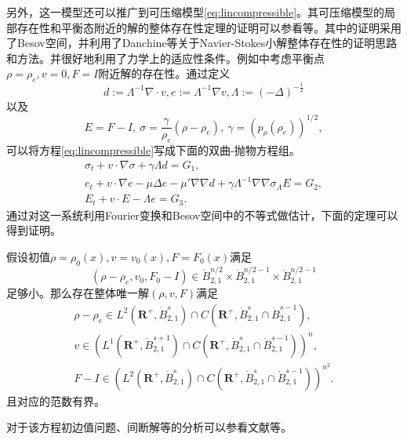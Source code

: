 \documentclass{article}
\begin{document}
另外，这一模型还可以推广到可压缩模型\eqref{eq:lincompressible}。其可压缩模型的局部存在性和平衡态附近的解的整体存在性定理的证明可以参看\cite{qian2010global,hu2011global,hu2012strong}等。其中的证明采用了Besov空间，并利用了Danchine等关于Navier-Stokes小解整体存在性的证明思路和方法\cite{danchin2000global}。并很好地利用了力学上的适应性条件。例如\cite{qian2010global}中考虑平衡点$\rho=\rho_e,v=0,F=I$附近解的存在性。通过定义
\begin{equation*}
	d:=\Lambda^{-1} \nabla \cdot v, e:= \Lambda^{-1} \nabla v, \Lambda :=(-\Delta)^{-\frac{1}{2}}
\end{equation*}
以及
\begin{equation*}
	E=F-I, \ \sigma = \frac{\gamma}{\rho_e} (\rho - \rho_e), \ \gamma = (p_{\rho}(\rho_e))^{1/2},
\end{equation*}
可以将方程\eqref{eq:lincompressible}写成下面的双曲-抛物方程组。
\begin{eqnarray*}
	\sigma_t + v \cdot \nabla \sigma + \gamma \Lambda d = G_1, \\
	e_t + v \cdot \nabla e - \mu \Delta e - \mu' \nabla \nabla d + \gamma \Lambda^{-1} \nabla \nabla \sigma _ \Lambda E = G_2, \\
	E_t + v \cdot E - \Lambda e = G_3.
\end{eqnarray*}
通过对这一系统利用Fourier变换和Besov空间中的不等式做估计，下面的定理可以得到证明\cite{qian2010global,hu2011global}。
\begin{theorem}
	假设初值$\rho=\rho_0(x),v=v_0(x),F=F_0(x)$满足
	\begin{equation*}
		(\rho - \rho_e,v_0,F_0-I) \in \dot{B}_{2,1}^{n/2} \times \dot{B}_{2,1}^{n/2-1} \times \dot{B}_{2,1}^{n/2-1}
	\end{equation*}
	足够小。那么存在整体唯一解$(\rho,v,F)$满足
	\begin{eqnarray*}
		\rho - \rho_e \in L^2(\mathbf{R}^+,\dot{B}_{2,1}^s) \cap C(\mathbf{R}^+,\dot{B}_{2,1}^s\cap \dot{B}_{2,1}^{s-1}),\\
		v \in \left( L^1(\mathbf{R}^+,\dot{B}_{2,1}^{s+1}) \cap C(\mathbf{R}^+,\dot{B}_{2,1}^s \cap \dot{B}_{2,1}^{s-1}) \right)^n, \\
		F- I \in \left( L^2(\mathbf{R}^+,\dot{B}_{2,1}^s) \cap C(\mathbf{R}^+,\dot{B}_{2,1}^s \cap \dot{B}_{2,1}^{s-1}) \right)^{n^2}.
	\end{eqnarray*}
	且对应的范数有界。
\end{theorem}

对于该方程初边值问题、间断解等的分析可以参看文献\cite{qian2011initial,lin2008initial,lei2010remarks,hu2012formation,hu2015global}等。
\end{document}
